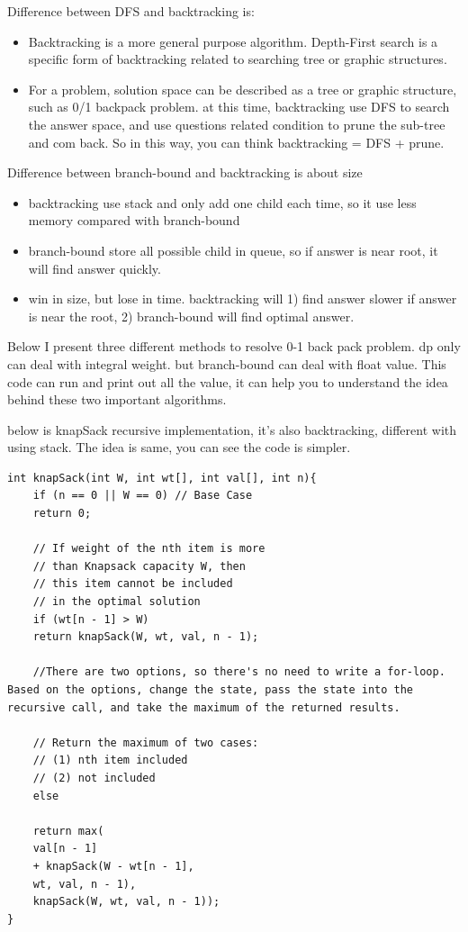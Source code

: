\documentclass[a4paper,11pt,twoside]{book}
\begin{document}
	\par Difference between DFS and backtracking is:
\begin{itemize}
\item Backtracking is a more general purpose algorithm. Depth-First search is a specific form of backtracking related to searching tree or graphic structures. 
 
\item For a problem, solution space can be described as a tree or graphic structure, such as 0/1 backpack problem. at this time, backtracking use DFS to search the answer space, and use questions related condition to prune the sub-tree and com back. So in this way, you can think backtracking = DFS + prune. 
\end{itemize}

\par Difference between branch-bound  and backtracking is about size

\begin{itemize}
\item backtracking use stack and only add one child each time, so it use less memory compared with branch-bound

\item branch-bound store all possible child in queue, so if answer is near root, it will find answer quickly. 

\item win in size, but lose in time. backtracking will 1) find answer slower if answer is near the root, 2) branch-bound will find optimal answer. 
\end{itemize}

	\par Below I present three different methods to resolve 0-1 back pack problem. dp only can deal with integral weight. but branch-bound can deal with float value. This code can run and print out all the value, it can help you to understand the idea behind these two important algorithms. 

\par below is knapSack recursive implementation, it's also backtracking, different with using stack. The idea is same, you can see the code is simpler. 
\begin{lstlisting}
int knapSack(int W, int wt[], int val[], int n){
	if (n == 0 || W == 0) // Base Case
	return 0;
	
	// If weight of the nth item is more
	// than Knapsack capacity W, then
	// this item cannot be included
	// in the optimal solution
	if (wt[n - 1] > W)
	return knapSack(W, wt, val, n - 1);
	
	//There are two options, so there's no need to write a for-loop. Based on the options, change the state, pass the state into the recursive call, and take the maximum of the returned results.
	
	// Return the maximum of two cases:
	// (1) nth item included
	// (2) not included
	else
	
	return max(
	val[n - 1]
	+ knapSack(W - wt[n - 1], 
	wt, val, n - 1),
	knapSack(W, wt, val, n - 1));
}			
\end{lstlisting}	
	  
\end{document}
